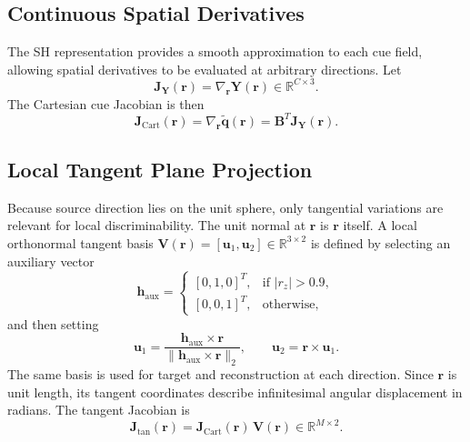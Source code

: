 \documentclass[journal]{IEEEtran}
\begin{document}
\subsection{Continuous Spatial Derivatives}

The SH representation provides a smooth approximation to each cue field, allowing spatial derivatives to be evaluated at arbitrary directions. Let
\[
\mathbf{J}_{\mathbf{Y}}(\mathbf{r}) =
\nabla_{\mathbf{r}}\mathbf{Y}(\mathbf{r})
\in \mathbb{R}^{C\times 3}.
\]
The Cartesian cue Jacobian is then
\begin{equation}
\mathbf{J}_{\mathrm{Cart}}(\mathbf{r})
=
\nabla_{\mathbf{r}}\widetilde{\mathbf{q}}(\mathbf{r})
=
\mathbf{B}^{T}\mathbf{J}_{\mathbf{Y}}(\mathbf{r}).
\end{equation}

\subsection{Local Tangent Plane Projection}
Because source direction lies on the unit sphere, only tangential variations are relevant for local discriminability. The unit normal at \(\mathbf{r}\) is \(\mathbf{r}\) itself. A local orthonormal tangent basis \(\mathbf{V}(\mathbf{r})=[\mathbf{u}_1,\mathbf{u}_2]\in\mathbb{R}^{3\times2}\) is defined by selecting an auxiliary vector
\[
\mathbf{h}_{\mathrm{aux}} =
\begin{cases}
 [0,1,0]^T, & \text{if } |r_z| > 0.9,\\
 [0,0,1]^T, & \text{otherwise},
\end{cases}
\]
and then setting
\begin{equation}
\mathbf{u}_1 = \frac{\mathbf{h}_{\mathrm{aux}}\times \mathbf{r}}{\|\mathbf{h}_{\mathrm{aux}}\times \mathbf{r}\|_2},
\qquad
\mathbf{u}_2 = \mathbf{r} \times \mathbf{u}_1.
\end{equation}
The same basis is used for target and reconstruction at each direction. Since \(\mathbf{r}\) is unit length, its tangent coordinates describe infinitesimal angular displacement in radians. The tangent Jacobian is
\begin{equation}
\mathbf{J}_{\mathrm{tan}}(\mathbf{r}) =
\mathbf{J}_{\mathrm{Cart}}(\mathbf{r})\,\mathbf{V}(\mathbf{r})
\in \mathbb{R}^{M\times2}.
\end{equation}
\end{document}
